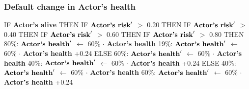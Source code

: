 \documentclass{article}%
\begin{document}
\subsubsection{Default change in Actor's health}%
\label{ssubsec:Default change in Actor's health}%
\begin{flushleft}%
IF %
\textbf{Actor's alive}%
\linebreak%
\hspace*{2em}%
THEN %
IF %
$\mbox{\textbf{Actor's risk}} '$%
$>$%
0.20%
\linebreak%
\hspace*{4em}%
THEN %
IF %
$\mbox{\textbf{Actor's risk}} '$%
$>$%
0.40%
\linebreak%
\hspace*{6em}%
THEN %
IF %
$\mbox{\textbf{Actor's risk}} '$%
$>$%
0.60%
\linebreak%
\hspace*{8em}%
THEN %
IF %
$\mbox{\textbf{Actor's risk}} '$%
$>$%
0.80%
\linebreak%
\hspace*{10em}%
THEN %
\linebreak%
\hspace*{12em}%
80\%: %
$\mbox{\textbf{Actor's health}} '$%
$\leftarrow$%
60\%%
$\cdot$%
\textbf{Actor's health}%
\linebreak%
\hspace*{12em}%
19\%: %
$\mbox{\textbf{Actor's health}} '$%
$\leftarrow$%
60\%%
$\cdot$%
\textbf{Actor's health}%
+0.24%
\linebreak%
\hspace*{10em}%
ELSE %
\linebreak%
\hspace*{12em}%
60\%: %
$\mbox{\textbf{Actor's health}} '$%
$\leftarrow$%
60\%%
$\cdot$%
\textbf{Actor's health}%
\linebreak%
\hspace*{12em}%
40\%: %
$\mbox{\textbf{Actor's health}} '$%
$\leftarrow$%
60\%%
$\cdot$%
\textbf{Actor's health}%
+0.24%
\linebreak%
\hspace*{8em}%
ELSE %
\linebreak%
\hspace*{10em}%
40\%: %
$\mbox{\textbf{Actor's health}} '$%
$\leftarrow$%
60\%%
$\cdot$%
\textbf{Actor's health}%
\linebreak%
\hspace*{10em}%
60\%: %
$\mbox{\textbf{Actor's health}} '$%
$\leftarrow$%
60\%%
$\cdot$%
\textbf{Actor's health}%
+0.24%

\end{flushleft}
\end{document}
